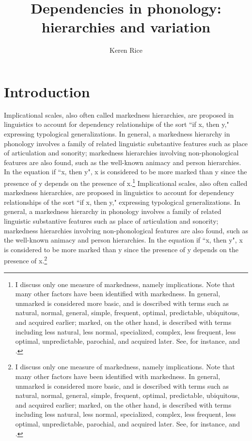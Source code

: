 \documentclass[output=paper]{langsci/langscibook}
\author{Keren Rice\affiliation{University of Toronto}}
\title{Dependencies in phonology: hierarchies and variation}
\begin{document}
 
\maketitle

\section{Introduction} \label{sec:intro}

   Implicational scales, also often called markedness hierarchies, are proposed in linguistics to account for dependency relationships of the sort ``if x, then y," expressing typological generalizations. In general, a markedness hierarchy in phonology involves a family of related linguistic substantive features such as place of articulation and sonority; markedness hierarchies involving non-phonological features are also found, such as the well-known animacy and person hierarchies. In the equation if ``x, then y", x is considered to be more marked than y since the presence of y depends on the presence of x.\footnote{I discuss only one measure of markedness, namely implications. Note that many other factors have been identified with markedness. In general, unmarked is considered more basic, and is described with terms such as natural, normal, general, simple, frequent, optimal, predictable, ubiquitous, and acquired earlier; marked, on the other hand, is described with terms including less natural, less normal, specialized, complex, less frequent, less optimal, unpredictable, parochial, and acquired later. See, for instance, \citet{Hume2011} and \citet{Rice2007}. }
   Implicational scales, also often called markedness hierarchies, are proposed in linguistics to account for dependency relationships of the sort ``if x, then y," expressing typological generalizations. In general, a markedness hierarchy in phonology involves a family of related linguistic substantive features such as place of articulation and sonority; markedness hierarchies involving non-phonological features are also found, such as the well-known animacy and person hierarchies. In the equation if ``x, then y", x is considered to be more marked than y since the presence of y depends on the presence of x.\footnote{I discuss only one measure of markedness, namely implications. Note that many other factors have been identified with markedness. In general, unmarked is considered more basic, and is described with terms such as natural, normal, general, simple, frequent, optimal, predictable, ubiquitous, and acquired earlier; marked, on the other hand, is described with terms including less natural, less normal, specialized, complex, less frequent, less optimal, unpredictable, parochial, and acquired later. See, for instance, \citet{Hume2011} and \citet{Rice2007}. }
\end{document}
